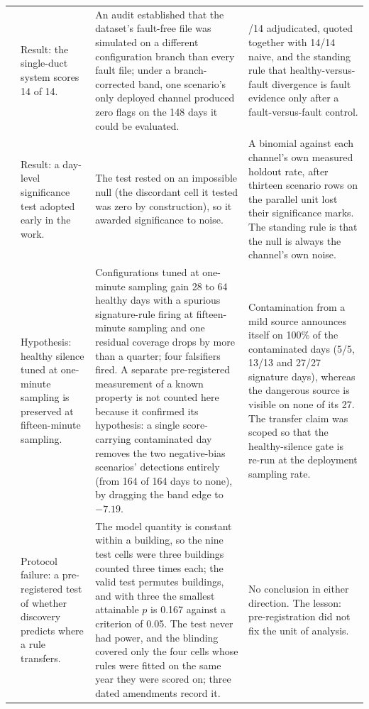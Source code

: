 \documentclass[11pt,letterpaper]{article}
\begin{document}
{\begin{longtable}{@{}>{\raggedright\arraybackslash}p{}>{\raggedright\arraybackslash}p{}>{\raggedright\arraybackslash}p{}>{\raggedright\arraybackslash}p{}@{}}
4 & Result: the single-duct system scores 14 of 14. & An audit established that the dataset's fault-free file was simulated on a different configuration branch than every fault file; under a branch-corrected band, one scenario's only deployed channel produced zero flags on the 148 days it could be evaluated. & 13/14 adjudicated, quoted together with 14/14 naive, and the standing rule that healthy-versus-fault divergence is fault evidence only after a fault-versus-fault control. \\
5 & Result: a day-level significance test adopted early in the work. & The test rested on an impossible null (the discordant cell it tested was zero by construction), so it awarded significance to noise. & A binomial against each channel's own measured holdout rate, after thirteen scenario rows on the parallel unit lost their significance marks. The standing rule is that the null is always the channel's own noise. \\
6 & Hypothesis: healthy silence tuned at one-minute sampling is preserved at fifteen-minute sampling. & Configurations tuned at one-minute sampling gain 28 to 64 healthy days with a spurious signature-rule firing at fifteen-minute sampling and one residual coverage drops by more than a quarter; four falsifiers fired. A separate pre-registered measurement of a known property is not counted here because it confirmed its hypothesis: a single score-carrying contaminated day removes the two negative-bias scenarios' detections entirely (from 164 of 164 days to none), by dragging the band edge to $-7.19$. & Contamination from a mild source announces itself on 100\% of the contaminated days (5/5, 13/13 and 27/27 signature days), whereas the dangerous source is visible on none of its 27. The transfer claim was scoped so that the healthy-silence gate is re-run at the deployment sampling rate. \\
\hline
7 & Protocol failure: a pre-registered test of whether discovery predicts where a rule transfers. & The model quantity is constant within a building, so the nine test cells were three buildings counted three times each; the valid test permutes buildings, and with three the smallest attainable $p$ is 0.167 against a criterion of 0.05. The test never had power, and the blinding covered only the four cells whose rules were fitted on the same year they were scored on; three dated amendments record it. & No conclusion in either direction. The lesson: pre-registration did not fix the unit of analysis. \\

\end{longtable}}
\end{document}
